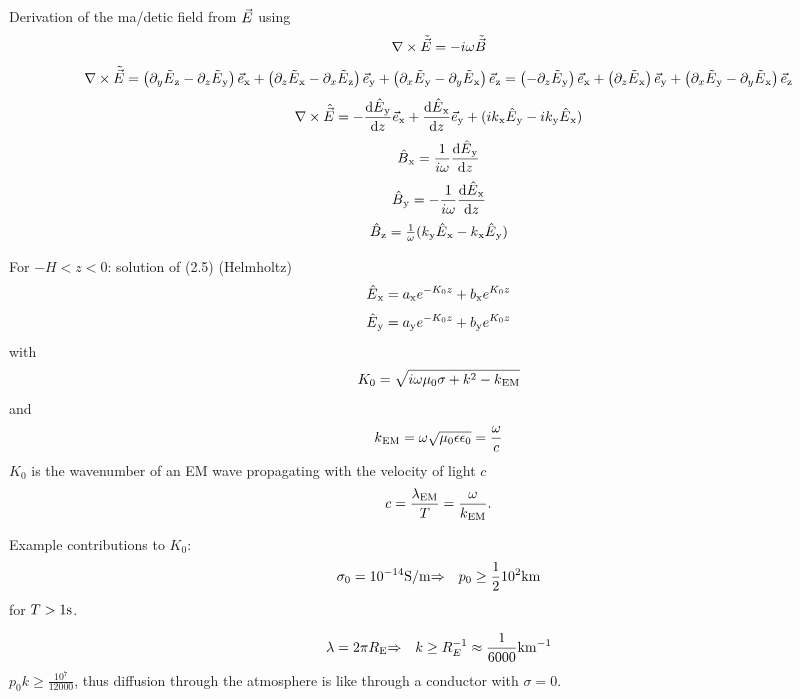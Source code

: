 Derivation of the ma/detic field from $\vec{E}$ using \[
  \nabla\times\tilde{\vec{E}} = -i\omega\tilde{\vec{B}}
\] \[
  \nabla\times\tilde{\vec{E}}
    = \left( \partial_y\tilde E\text{$_{\mathrm{z}}$} - \partial_z \tilde E\text{$_{\mathrm{y}}$} \right) \vec{e}\text{$_{\mathrm{x}}$}
    + \left( \partial_z\tilde E\text{$_{\mathrm{x}}$} - \partial_x \tilde E\text{$_{\mathrm{z}}$} \right) \vec{e}\text{$_{\mathrm{y}}$}
    + \left( \partial_x\tilde E\text{$_{\mathrm{y}}$} - \partial_y \tilde E\text{$_{\mathrm{x}}$} \right) \vec{e}\text{$_{\mathrm{z}}$}
    = \left( - \partial_z \tilde E\text{$_{\mathrm{y}}$} \right) \vec{e}\text{$_{\mathrm{x}}$}
    + \left( \partial_z\tilde E\text{$_{\mathrm{x}}$}  \right) \vec{e}\text{$_{\mathrm{y}}$}
    + \left( \partial_x\tilde E\text{$_{\mathrm{y}}$} - \partial_y \tilde E\text{$_{\mathrm{x}}$} \right) \vec{e}\text{$_{\mathrm{z}}$}
\] \[
  \nabla\times\hat{\vec{E}}
     = -\frac{\mathrm{d}\hat E\text{$_{\mathrm{y}}$}}{\mathrm{d} z}\vec{e}\text{$_{\mathrm{x}}$}
       + \frac{\mathrm{d}\hat E\text{$_{\mathrm{x}}$}}{\mathrm{d} z}\vec{e}\text{$_{\mathrm{y}}$}
       + (ik\text{$_{\mathrm{x}}$} \hat E\text{$_{\mathrm{y}}$} - ik\text{$_{\mathrm{y}}$}\hat E\text{$_{\mathrm{x}}$})
\] \setcounter{equation}{15}\[
  \hat B\text{$_{\mathrm{x}}$} = \frac{1}{i\omega}\frac{\mathrm{d}\hat E\text{$_{\mathrm{y}}$}}{\mathrm{d} z}
\] \[
  \hat B\text{$_{\mathrm{y}}$} = -\frac{1}{i\omega}\frac{\mathrm{d}\hat E\text{$_{\mathrm{x}}$}}{\mathrm{d} z}
\] \[
  \hat B\text{$_{\mathrm{z}}$} = \tfrac1\omega (k\text{$_{\mathrm{y}}$}\hat E\text{$_{\mathrm{x}}$} - k\text{$_{\mathrm{x}}$}\hat E\text{$_{\mathrm{y}}$})
\]

For $-H < z < 0$: solution of (2.5) (Helmholtz) \[
  \hat E\text{$_{\mathrm{x}}$} = a\text{$_{\mathrm{x}}$} e^{-K_0 z} + b\text{$_{\mathrm{x}}$} e^{K_0 z}
\] \[
  \hat E\text{$_{\mathrm{y}}$} = a\text{$_{\mathrm{y}}$} e^{-K_0 z} + b\text{$_{\mathrm{y}}$} e^{K_0 z}
\] with \[
  K_0 = \sqrt{i\omega\mu_0\sigma + k^2 - k\text{$_{\mathrm{EM}}$}}
\] and \setcounter{equation}{16}\[
  k\text{$_{\mathrm{EM}}$} = \omega\sqrt{\mu_0\epsilon\epsilon_0} = \frac{\omega}{c}
\] $K_0$ is the wavenumber of an EM wave propagating with the velocity
of light $c$ \[
  c = \frac{\lambda\text{$_{\mathrm{EM}}$}}{T} = \frac{\omega}{k\text{$_{\mathrm{EM}}$}}.
\]

Example contributions to $K_0$: \[
  \sigma_0 = 10^{-14}\mathrm{S/m} {\Rightarrow\quad} p_0 \geq \frac12 10^2\mathrm{km}
\] for $T>1\mathrm{s}$.

\[
  \lambda = 2\pi R\text{$_{\mathrm{E}}$} {\Rightarrow\quad} k\geq R_E^{-1} \approx \frac1{6000}\mathrm{km^{-1}}
\] $p_0k \geq \frac{10^7}{12000}$, thus diffusion through the atmosphere
is like through a conductor with $\sigma = 0$.
